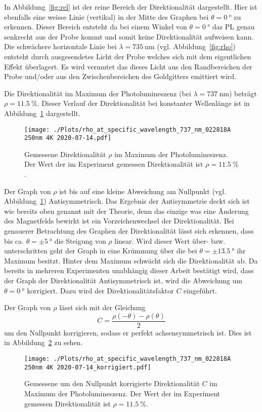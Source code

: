 In Abbildung~\ref{fig:rel} ist der reine Bereich der Direktionalität dargestellt.
Hier ist ebenfalls eine weisse Linie (vertikal) in der Mitte des Graphen bei $\theta = \SI{0}{\degree}$ zu erkennen.
Dieser Bereich entsteht da bei einem Winkel von $\theta = \SI{0}{\degree}$ das PL genau senkrecht aus der Probe kommt
und somit keine Direktionalität aufweisen kann.
Die schwächere horizontale Linie bei $\lambda = \SI{735}{\nano\meter}$ 
(vgl. Abbildung~\ref{fig:rho}) entsteht durch 
ausgesendetes Licht der Probe welches sich mit dem eigentlichen Effekt überlagert. 
Es wird vermutet das dieses Licht aus den Randbereichen der Probe und/oder aus den Zwischenbereichen des Goldgitters 
emittiert wird.

Die Direktionalität im Maximum der Photolumineszenz (bei $\lambda = \SI{737}{\nano\meter}$) beträgt
$\rho = \SI{11,5}{\percent}$. 
Dieser Verlauf der Direktionalität bei konstanter Wellenlänge ist in Abbildung~\ref{fig:dir} dargestellt.
\begin{figure}
    \centering
    \texttt{[image: ./Plots/rho\_at\_specific\_wavelength\_737\_nm\_022818A 250nm 4K 2020-07-14.pdf]}
    \caption{Gemessene Direktionalität $\rho$ im Maximum der Photolumineszenz.
    Der Wert der im Experiment gemessen Direktionalität ist $\rho = \SI{11,5}{\percent}$.}
    \label{fig:dir}
\end{figure}
\FloatBarrier

Der Graph von $\rho$ ist bis auf eine kleine Abweichung am Nullpunkt (vgl. Abbildung~\ref{fig:dir}) 
Antisymmetrisch. 
Das Ergebnis der Antisymmetrie deckt sich ist wie bereits oben genannt mit der Theorie, denn das einzige was eine
Änderung des Magnetfelds bewirkt ist ein Vorzeichenwechsel der Direktionalität.
Bei genauerer Betrachtung des Graphen der Direktionalität lässt sich erkennen, dass bis ca. $\theta = \pm \SI{5}{\degree}$
die Steigung von $\rho$ linear.
Wird dieser Wert über- bzw. unterschritten geht der Graph in eine Krümmung über die bei $\theta = \pm \SI{13,5}{\degree}$
ihr Maximum besitzt. 
Hinter dem Maximum schwächt sich die Direktionalität ab.
Da bereits in mehreren Experimenten unabhängig dieser Arbeit bestätigt wird, dass der Graph
der Direktionalität Antisymmetrisch ist, wird die Abweichung um $\theta = \SI{0}{\degree}$
korrigiert.
Dazu wird der Direktionalitätsfaktor $C$ eingeführt. 

Der Graph von $\rho$ lässt sich mit der Gleichung 
\begin{equation}
    C= \frac{\rho(-\theta)-\rho(\theta)}{2}
    \label{eq:C} 
\end{equation}
um den Nullpunkt korrigieren, sodass er perfekt achsensymmetrisch ist.
Dies ist in Abbildung~\ref{fig:dir_kor} zu sehen.
\begin{figure}
    \centering
    \texttt{[image: ./Plots/rho\_at\_specific\_wavelength\_737\_nm\_022818A 250nm 4K 2020-07-14\_korrigiert.pdf]}
    \caption{Gemessene um den Nullpunkt korrigierte Direktionalität $C$ im Maximum der Photolumineszenz.
    Der Wert der im Experiment gemessen Direktionalität ist $\rho = \SI{11,5}{\percent}$.}
    \label{fig:dir_kor}
\end{figure}
\FloatBarrier


